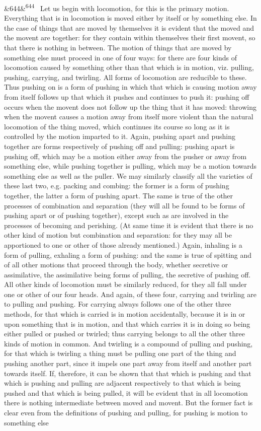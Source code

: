 \documentclass[12pt]{article}
\newcommand{\para}[1][]{\par\noindent\ifx&#1&\else\textsuperscript{\footnotesize #1}~\fi}
\begin{document}
\para[644] Let us begin with locomotion, for this is the primary motion. Everything that is in locomotion is moved either by itself or by something else. In the case of things that are moved by themselves it is evident that the moved and the movent are together: for they contain within themselves their first movent, so that there is nothing in between. The motion of things that are moved by something else must proceed in one of four ways: for there are four kinds of locomotion caused by something other than that which is in motion, viz. pulling, pushing, carrying, and twirling. All forms of locomotion are reducible to these. Thus pushing on is a form of pushing in which that which is causing motion away from itself follows up that which it pushes and continues to push it: pushing off occurs when the movent does not follow up the thing that it has moved: throwing when the movent causes a motion away from itself more violent than the natural locomotion of the thing moved, which continues its course so long as it is controlled by the motion imparted to it. Again, pushing apart and pushing together are forms respectively of pushing off and pulling: pushing apart is pushing off, which may be a motion either away from the pusher or away from something else, while pushing together is pulling, which may be a motion towards something else as well as the puller. We may similarly classify all the varieties of these last two, e.g. packing and combing: the former is a form of pushing together, the latter a form of pushing apart. The same is true of the other processes of combination and separation (they will all be found to be forms of pushing apart or of pushing together), except such as are involved in the processes of becoming and perishing. (At same time it is evident that there is no other kind of motion but combination and separation: for they may all be apportioned to one or other of those already mentioned.) Again, inhaling is a form of pulling, exhaling a form of pushing: and the same is true of spitting and of all other motions that proceed through the body, whether secretive or assimilative, the assimilative being forms of pulling, the secretive of pushing off. All other kinds of locomotion must be similarly reduced, for they all fall under one or other of our four heads. And again, of these four, carrying and twirling are to pulling and pushing. For carrying always follows one of the other three methods, for that which is carried is in motion accidentally, because it is in or upon something that is in motion, and that which carries it is in doing so being either pulled or pushed or twirled; thus carrying belongs to all the other three kinds of motion in common. And twirling is a compound of pulling and pushing, for that which is twirling a thing must be pulling one part of the thing and pushing another part, since it impels one part away from itself and another part towards itself. If, therefore, it can be shown that that which is pushing and that which is pushing and pulling are adjacent respectively to that which is being pushed and that which is being pulled, it will be evident that in all locomotion there is nothing intermediate between moved and movent. But the former fact is clear even from the definitions of pushing and pulling, for pushing is motion to something else 
\end{document}
